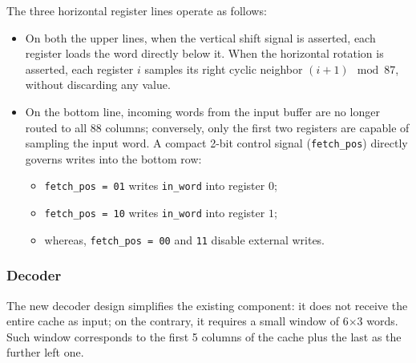 The three horizontal register lines operate as follows:
\begin{itemize}
    \item On both the upper lines, when the vertical shift signal is asserted, each register loads the word directly below it. When the horizontal rotation is asserted, each register $i$ samples its right cyclic neighbor $(i+1)\mod 87$, without discarding any value.
    \item On the bottom line, incoming words from the input buffer are no longer routed to all 88 columns; conversely, only the first two registers are capable of sampling the input word. A compact 2-bit control signal (\texttt{fetch\_pos}) directly governs writes into the bottom row:
    \begin{itemize}
        \item \texttt{fetch\_pos = 01} writes \texttt{in\_word} into register $0$;
        \item \texttt{fetch\_pos = 10} writes \texttt{in\_word} into register $1$;
        \item whereas, \texttt{fetch\_pos = 00} and \texttt{11} disable external writes.
    \end{itemize}
\end{itemize}

\subsubsection{Decoder}

The new decoder design simplifies the existing component: it does not receive the entire cache as input; on the contrary, it requires a small window of 6$\times$3 words. Such window corresponds to the first 5 columns of the cache plus the last as the further left one.

\usetikzlibrary{matrix, positioning, arrows.meta, calc, backgrounds, fit}

